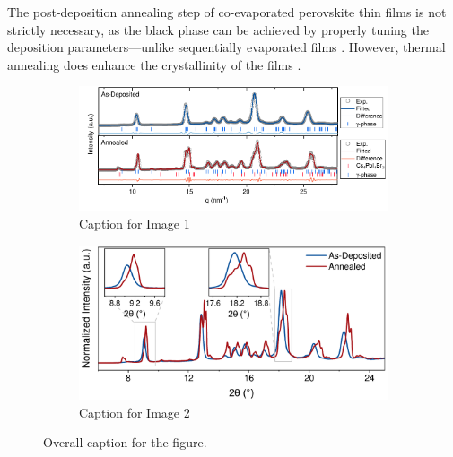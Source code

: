 The post-deposition annealing step of co-evaporated perovskite thin films is not strictly necessary, as the black phase can be achieved by properly tuning the deposition parameters---unlike sequentially evaporated films \cite{DongGrowthFilm}. However, thermal annealing does enhance the crystallinity of the films \cite{Frolova2017HighlyPbIsub2/sub}. 

\begin{figure}[htbp]
    \centering
    \begin{subfigure}[b]{\textwidth}
    \centering
        \includegraphics[width=0.85\linewidth]{chapters/material_properties/images/GIWAXS_Before_After.pdf}
        \caption{Caption for Image 1}
        \label{fig:ch2:giwaxs_before_after:model}
    \end{subfigure}

    \vspace{0.5cm}
    
    \begin{subfigure}[b]{\textwidth}
    \centering
    \hspace{-1.4cm}
        \includegraphics[width=0.68\linewidth]{chapters/material_properties/images/giwaxs_overlayed.pdf}
        \caption{Caption for Image 2}
        \label{fig:ch2:giwaxs_before_after:overlay}
    \end{subfigure}
    
    \caption{Overall caption for the figure.}
    \label{fig:ch2:giwaxs_before_after:}
\end{figure}



